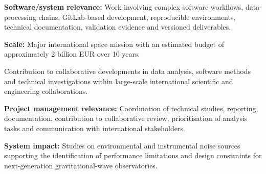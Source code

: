 \documentclass[8pt,a4paper,ragged2e,withhyper]{altacv}
\begin{document}
\textbf{Software/system relevance:} Work involving complex software workflows, data-processing chains, GitLab-based development, reproducible environments, technical documentation, validation evidence and versioned deliverables.

\textbf{Scale:} Major international space mission with an estimated budget of approximately 2 billion EUR over 10 years.

\divider


Contribution to collaborative developments in data analysis, software methods and technical investigations within large-scale international scientific and engineering collaborations.

\textbf{Project management relevance:} Coordination of technical studies, reporting, documentation, contribution to collaborative review, prioritisation of analysis tasks and communication with international stakeholders.

\textbf{System impact:} Studies on environmental and instrumental noise sources supporting the identification of performance limitations and design constraints for next-generation gravitational-wave observatories.


\vspace{-.3cm}


{\small
{}
}

\divider\smallskip
\vspace{-.3cm}
\newpage


{\small
{}
}
\end{document}
